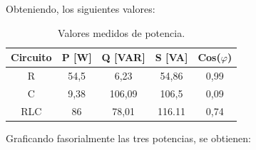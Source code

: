 \documentclass[a4paper]{article}
\begin{document}
Obteniendo, los siguientes valores:

\begin{table}[H]
\centering
\begin{tabular}{|c|c|c|c|c|}
\hline
\textbf{Circuito} & \textbf{P {[}W{]}} & \textbf{Q {[}VAR{]}} & \textbf{S {[}VA{]}} & \textbf{Cos($\varphi$)} \\ \hline
R                 & 54,5               & 6,23                 & 54,86                & 0,99                                \\ \hline
C                 & 9,38               & 106,09               & 106,5                & 0,09                                \\ \hline
RLC               &  86              & 78,01                & 116.11                  & 0,74                                \\ \hline
\end{tabular}
\caption{Valores medidos de potencia.}
\end{table}

Graficando fasorialmente las tres potencias, se obtienen:
\end{document}
